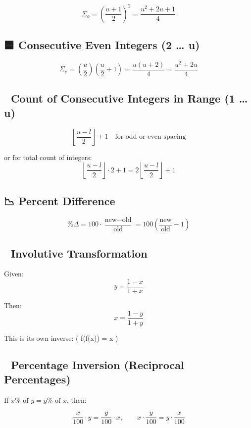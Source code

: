 \documentclass[
  letterpaper,
]{book}
\begin{document}
\[
\Sigma_o = \left( \frac{u + 1}{2} \right)^2 = \frac{u^2 + 2u + 1}{4}
\]

\subsection{🟦 Consecutive Even Integers (2 \ldots{}
u)}\label{consecutive-even-integers-2-u}

\[
\Sigma_e = \left( \frac{u}{2} \right) \left( \frac{u}{2} + 1 \right) = \frac{u(u + 2)}{4} = \frac{u^2 + 2u}{4}
\]

\subsection{🧮 Count of Consecutive Integers in Range (1 \ldots{}
u)}\label{count-of-consecutive-integers-in-range-1-u}

\[
\left\lfloor \frac{u - l}{2} \right\rfloor + 1 \quad \text{for odd or even spacing}
\]

or for total count of integers: \[
\left\lfloor \frac{u - l}{2} \right\rfloor \cdot 2 + 1 = 2\left\lfloor \frac{u - l}{2} \right\rfloor + 1
\]

\subsection{📉 Percent Difference}\label{percent-difference}

\[
\%\Delta = 100 \cdot \frac{\text{new} - \text{old}}{\text{old}} = 100 \left( \frac{\text{new}}{\text{old}} - 1 \right)
\]

\subsection{🔁 Involutive
Transformation}\label{involutive-transformation}

Given: \[
y = \frac{1 - x}{1 + x}
\]

Then: \[
x = \frac{1 - y}{1 + y}
\]

This is its own inverse: ( f(f(x)) = x )

\subsection{🔄 Percentage Inversion (Reciprocal
Percentages)}\label{percentage-inversion-reciprocal-percentages}

If \(x\% \text{ of } y = y\% \text{ of } x\), then:

\[
\frac{x}{100} \cdot y = \frac{y}{100} \cdot x, \qquad
x \cdot \frac{y}{100} = y \cdot \frac{x}{100}
\]
\end{document}
